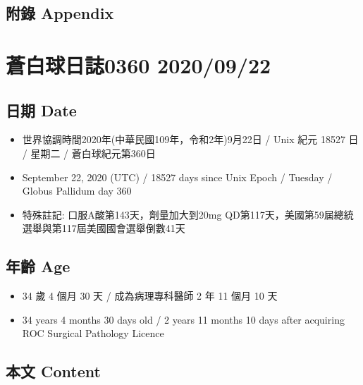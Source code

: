 \documentclass[a5paper, 11pt
]{book}
\providecommand{\tightlist}{%
  \setlength{\itemsep}{0pt}\setlength{\parskip}{0pt}}
\begin{document}
\hypertarget{ux9644ux9304-appendix-20}{%
\subsection{附錄 Appendix}\label{ux9644ux9304-appendix-20}}

\hypertarget{ux84bcux767dux7403ux65e5ux8a8c0360-20200922}{%
\section{蒼白球日誌0360
2020/09/22}\label{ux84bcux767dux7403ux65e5ux8a8c0360-20200922}}

\hypertarget{ux65e5ux671f-date-21}{%
\subsection{日期 Date}\label{ux65e5ux671f-date-21}}

\begin{itemize}
\tightlist
\item
  世界協調時間2020年(中華民國109年，令和2年)9月22日 / Unix 紀元 18527 日
  / 星期二 / 蒼白球紀元第360日
\item
  September 22, 2020 (UTC) / 18527 days since Unix Epoch / Tuesday /
  Globus Pallidum day 360
\item
  特殊註記: 口服A酸第143天，劑量加大到20mg
  QD第117天，美國第59屆總統選舉與第117屆美國國會選舉倒數41天
\end{itemize}

\hypertarget{ux5e74ux9f61-age-21}{%
\subsection{年齡 Age}\label{ux5e74ux9f61-age-21}}

\begin{itemize}
\tightlist
\item
  34 歲 4 個月 30 天 / 成為病理專科醫師 2 年 11 個月 10 天
\item
  34 years 4 months 30 days old / 2 years 11 months 10 days after
  acquiring ROC Surgical Pathology Licence
\end{itemize}

\hypertarget{ux672cux6587-content-21}{%
\subsection{本文 Content}\label{ux672cux6587-content-21}}
\end{document}
